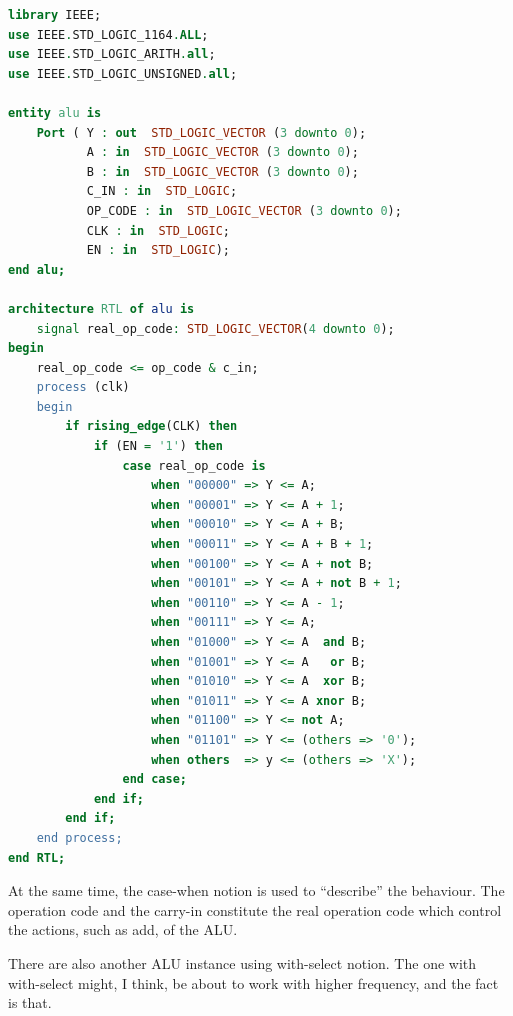 \documentclass{article}
\begin{document}
    \begin{lstlisting}[language=VHDL]
library IEEE;
use IEEE.STD_LOGIC_1164.ALL;
use IEEE.STD_LOGIC_ARITH.all;
use IEEE.STD_LOGIC_UNSIGNED.all;

entity alu is
    Port ( Y : out  STD_LOGIC_VECTOR (3 downto 0);
           A : in  STD_LOGIC_VECTOR (3 downto 0);
           B : in  STD_LOGIC_VECTOR (3 downto 0);
           C_IN : in  STD_LOGIC;
           OP_CODE : in  STD_LOGIC_VECTOR (3 downto 0);
           CLK : in  STD_LOGIC;
           EN : in  STD_LOGIC);
end alu;

architecture RTL of alu is
	signal real_op_code: STD_LOGIC_VECTOR(4 downto 0);
begin
	real_op_code <= op_code & c_in;
	process (clk)
	begin
		if rising_edge(CLK) then
			if (EN = '1') then
				case real_op_code is
					when "00000" => Y <= A;
					when "00001" => Y <= A + 1;
					when "00010" => Y <= A + B;
					when "00011" => Y <= A + B + 1;
					when "00100" => Y <= A + not B;
					when "00101" => Y <= A + not B + 1;
					when "00110" => Y <= A - 1;
					when "00111" => Y <= A;
					when "01000" => Y <= A  and B;
					when "01001" => Y <= A   or B;
					when "01010" => Y <= A  xor B;
					when "01011" => Y <= A xnor B;
					when "01100" => Y <= not A;
					when "01101" => Y <= (others => '0');
					when others  => y <= (others => 'X');
				end case;
			end if;
		end if;
	end process;
end RTL;
    \end{lstlisting}

    At the same time, the case-when notion is used to ``describe'' the behaviour. The operation code
    and the carry-in constitute the real operation code which control the actions, such as add, of the ALU.
    
    There are also another ALU instance using with-select notion. The one with with-select might, I think, be about to
    work with higher frequency, and the fact is that.
\end{document}
